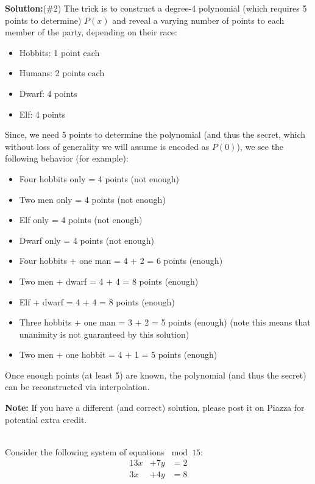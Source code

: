 \documentclass[]{article}
\renewcommand{\answer}[1]{{\color{mydarkblue}\textbf{Solution:}#1}}
\begin{document}
\begin{qunlist}
{{\answer (\#2) The trick is to construct a degree-4 polynomial (which requires 5 points to determine) $P(x)$ and reveal a varying number of points to each member of the party, depending on their race:

\begin{itemize}
	\item Hobbits: 1 point each
	\item Humans: 2 points each
	\item Dwarf: 4 points
	\item Elf: 4 points
\end{itemize}

Since, we need 5 points to determine the polynomial (and thus the secret, which without loss of generality we will assume is encoded as $P(0)$), we see the following behavior (for example):
\begin{itemize}
	\item Four hobbits only = 4 points (not enough)
	\item Two men only = 4 points (not enough)
	\item Elf only = 4 points (not enough)
	\item Dwarf only = 4 points (not enough)
	\item Four hobbits + one man = 4 + 2 = 6 points (enough)
	\item Two men + dwarf = 4 + 4 = 8 points (enough)
	\item Elf + dwarf = 4 + 4 = 8 points (enough)
	\item Three hobbits + one man = 3 + 2 = 5 points (enough) (note this means that unanimity is not guaranteed by this solution)
	\item Two men + one hobbit = 4 + 1 = 5 points (enough)
\end{itemize}

Once enough points (at least 5) are known, the polynomial (and thus the secret) can be reconstructed via interpolation.

\textbf{Note:} If you have a different (and correct) solution, please post it on Piazza for potential extra credit.

}}\fi



\\ %
Consider the following system of equations $\bmod{15}$:
\begin{align*}
13x &+ 7y &= 2 \\
3x &+ 4y &= 8
\end{align*}


\end{qunlist}
\end{document}
